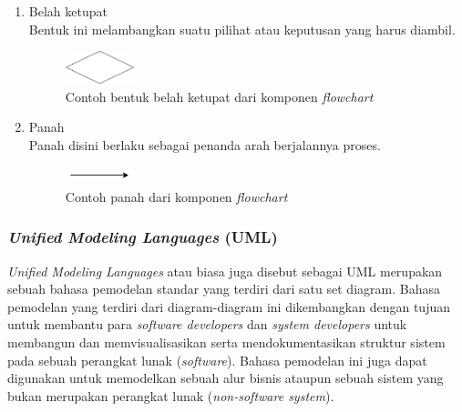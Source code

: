 \documentclass[a4paper]{article}
\newcommand{\subsubbab}[1]{%
    \subsubsection{#1}%
}
\begin{document}
\begin{enumerate}
    \newpage
    \item Belah ketupat\\
        Bentuk ini melambangkan suatu pilihat atau keputusan yang harus diambil.\\
    \begin{figure}[h]
        \centering
        \includegraphics*[width=2cm]{./diagram/flowchart/component/diamond.png}
        \caption{Contoh bentuk belah ketupat dari komponen \textit{flowchart}}
    \end{figure}
    \item Panah\\
        Panah disini berlaku sebagai penanda arah berjalannya proses.
    \begin{figure}[h]
        \centering
        \includegraphics*[width=2cm,height=0.5cm]{./diagram/flowchart/component/arrow.png}
        \caption{Contoh panah dari komponen \textit{flowchart}}
    \end{figure}
\end{enumerate}

\subsubbab{\textit{Unified Modeling Languages} (\textbf{UML})}
\textit{Unified Modeling Languages} atau biasa juga disebut sebagai UML merupakan sebuah bahasa pemodelan standar yang terdiri dari satu set diagram. Bahasa pemodelan yang terdiri dari diagram-diagram ini dikembangkan dengan tujuan untuk membantu para \textit{software developers} dan \textit{system developers} untuk membangun dan memvisualisasikan serta mendokumentasikan struktur sistem pada sebuah perangkat lunak (\textit{software}). Bahasa pemodelan ini juga dapat digunakan untuk memodelkan sebuah alur bisnis ataupun sebuah sistem yang bukan merupakan perangkat lunak (\textit{non-software system})\autocite{what-is-UML}.
\end{document}
